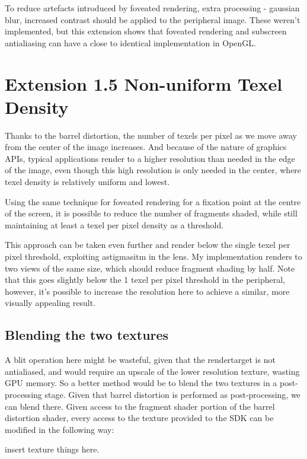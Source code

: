 \documentclass[12pt,a4paper,twoside,openright]{report}
\begin{document}
To reduce artefacts introduced by foveated rendering, extra processing - gaussian blur, increased contrast should be applied to the peripheral image. These weren't implemented, but this extension shows that foveated rendering and subscreen antialiasing can have a close to identical implementation in OpenGL.

\section{Extension 1.5 Non-uniform Texel Density}

Thanks to the barrel distortion, the number of texels per pixel as we move away from the center of the image increases. And because of the nature of graphics APIs, typical applications render to a higher resolution than needed in the edge of the image, even though this high resolution is only needed in the center, where texel density is relatively uniform and lowest.

Using the same technique for foveated rendering for a fixation point at the centre of the screen, it is possible to reduce the number of fragments shaded, while still maintaining at least a texel per pixel density as a threshold.

This approach can be taken even further and render below the single texel per pixel threshold, exploiting astigmasitm in the lens. My implementation renders to two views of the same size, which should reduce fragment shading by half. Note that this goes slightly below the 1 texel per pixel threshold in the peripheral, however, it's possible to increase the resolution here to achieve a similar, more visually appealing result.

\subsection{Blending the two textures}

A blit operation here might be wasteful, given that the rendertarget is not antialiased, and would require an upscale of the lower resolution texture, wasting GPU memory. So a better method would be to blend the two textures in a post-processing stage. Given that barrel distortion is performed as post-processing, we can blend there. Given access to the fragment shader portion of the barrel distortion shader, every access to the texture provided to the SDK can be modified in the following way:

\begin{blockcode}
insert texture things here.
\end{blockcode}
\end{document}
